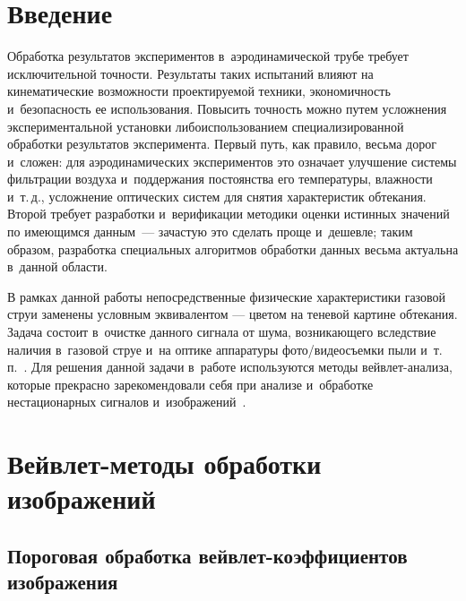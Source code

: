   



\thispagestyle{headings}

\begin{multicols}{2}

\label{st\stat}


\section{Введение}

Обработка результатов экспериментов в~аэродинамической трубе требует
исключительной точ\-ности. Результаты таких испытаний влияют на
кинематические возможности проектируемой техники, экономичность 
и~безопасность ее использования. Повысить точность можно путем
услож\-не\-ния экспериментальной установки либо\linebreak использованием
специализированной обработки результатов эксперимента. Первый путь,
как правило, весьма дорог и~сложен: для аэродинамических
экспериментов это означает улучшение системы фильтрации воздуха 
и~поддержания постоянства его температуры, влажности и~т.\,д.,
усложнение оптических систем для снятия характеристик обтекания.
Второй требует разработки и~верификации методики оценки истинных
значений по имеющимся данным~--- зачастую это сделать проще 
и~дешевле; таким образом, разработка специальных алгоритмов обработки
данных весьма актуальна в~данной области.

В рамках данной работы непосредственные физические характеристики
газовой струи заменены условным эквивалентом --- цветом на теневой
картине обтекания. Задача состоит в~очистке данного сигнала от шума,
возникающего вследствие наличия в~газовой струе и~на оптике
аппаратуры фото/видеосъемки пыли и~т.\,п.~\cite{holder, krasnov}. Для
решения данной задачи в~работе используются методы вейв\-лет-анализа,
которые прекрасно зарекомендовали себя при анализе и~обработке
нестационарных сигналов и~изображений~\cite{smolentsev, posobie}.


\section{Вейвлет-методы обработки изображений}

\subsection{Пороговая обработка вейвлет-коэффициентов изображения}


\end{multicols}
